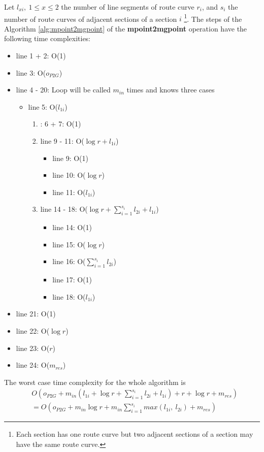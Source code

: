 \documentclass[a4paper]{article}
\newcommand{\op}[1]{\textbf{#1}}
\begin{document}
Let $l_{xi},\ 1 \leq x \leq 2$ the number of line segments of route curve $r_i$,
and $s_i$ the number of route curves of adjacent sections of a section $i$
\footnote{Each section has one route curve but two adjacent sections of a section may have the same route curve.}.
The steps of the Algorithm \ref{alg:mpoint2mgpoint} of the \op{mpoint2mgpoint}
operation have the following time complexities:
\begin{itemize}
  \item[] line 1 + 2: O(1)
  \item[] line 3: O($o_{P2G}$)
  \item[] line 4 - 20: Loop will be called $m_{in}$ times and knows three cases
  \begin{itemize}
    \item[] line 5: O($l_{1i}$)
    \begin{enumerate}
      \item: 6 + 7: O(1)
      \item line 9 - 11: O($\log r + l_{1i}$)
      \begin{itemize}
        \item[] line 9: O(1)
        \item[] line 10: O($\log r$)
        \item[] line 11: O($l_{1i}$)
      \end{itemize}
      \item line 14 - 18: O($\log r + \sum_{i=1}^{s_i}{l_{2i}} + l_{1i}$)
      \begin{itemize}
        \item[] line 14: O(1)
        \item[] line 15: O($\log r$)
        \item[] line 16: O($\sum_{i=1}^{s_i}{l_{2i}}$)
        \item[] line 17: O(1)
        \item[] line 18: O($l_{1i}$)
      \end{itemize}
    \end{enumerate}
  \end{itemize}
  \item[] line 21: O(1)
  \item[] line 22: O($\log r$)
  \item[] line 23: O($r$)
  \item[] line 24: O($m_{res}$)
\end{itemize}
The worst case time complexity for the whole algorithm is
\begin{align*}
&O(o_{P2G} + m_{in}(l_{1i} + \log r + \sum_{i=1}^{s_i}{l_{2i}} + l_{1i}) + r + \log r + m_{res})\\
&= O(o_{P2G}+ m_{in}\log r + m_{in}\sum_{i=1}^{s_i}{max(l_{1i},\ l_{2i})} + m_{res})
\end{align*}
\end{document}
